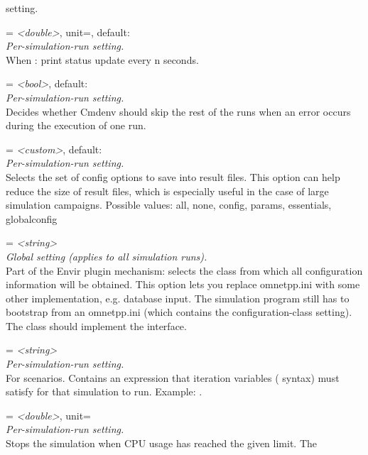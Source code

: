 \begin{description}
    setting.
\item[cmdenv-status-frequency] = \textit{<double>}, unit=, default: \\
    \textit{Per-simulation-run setting.}\\
    When :
    print status update every n seconds.
\item[cmdenv-stop-batch-on-error] = \textit{<bool>}, default: \\
    \textit{Per-simulation-run setting.}\\
    Decides whether Cmdenv should skip the rest of the runs when an error
    occurs during the execution of one run.
\item[config-recording] = \textit{<custom>}, default: \\
    \textit{Per-simulation-run setting.}\\
    Selects the set of config options to save into result files. This option
    can help reduce the size of result files, which is especially useful in the
    case of large simulation campaigns. Possible values: all, none, config,
    params, essentials, globalconfig
\item[configuration-class] = \textit{<string>}\\
    \textit{Global setting (applies to all simulation runs).}\\
    Part of the Envir plugin mechanism: selects the class from which all
    configuration information will be obtained. This option lets you replace
    omnetpp.ini with some other implementation, e.g. database input. The
    simulation program still has to bootstrap from an omnetpp.ini (which
    contains the configuration-class setting). The class should implement the
     interface.
\item[constraint] = \textit{<string>}\\
    \textit{Per-simulation-run setting.}\\
    For scenarios. Contains an expression that iteration variables
    (\ttt{\$\{{\allowbreak}\}{\allowbreak}} syntax) must satisfy for that
    simulation to run. Example: .
\item[cpu-time-limit] = \textit{<double>}, unit=\\
    \textit{Per-simulation-run setting.}\\
    Stops the simulation when CPU usage has reached the given limit. The

\end{description}
